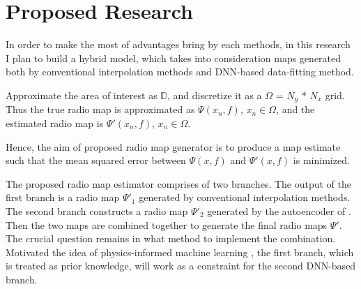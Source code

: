 \documentclass[conference]{IEEEtran}
\begin{document}
\section{Proposed Research}
In order to make the most of advantages bring by each methods, in this research I plan to build a hybrid model, which takes into consideration maps generated both by conventional interpolation methods and DNN-based data-fitting method.

Approximate the area of interest as $\mathbb{D}$, and discretize it as a $\Omega$ = $N_y$ * $N_x$ grid. Thus the true radio map is approximated as $\Psi(x_n, f)$, $x_n \in \Omega$, and the estimated radio map is $\Psi'(x_n, f)$, $x_n \in \Omega$.

Hence, the aim of proposed radio map generator is to produce a map estimate such that the mean squared error between  $\Psi(x, f)$ and $\Psi'(x, f)$ is minimized.

The proposed radio map estimator comprises of two branches. The output of the first branch is a radio map $\Psi'_1$ generated by conventional interpolation methods. The second branch constructs a radio map $\Psi'_2$ generated by the autoencoder of \cite{b9}. Then the two maps are combined together to generate the final radio maps $\Psi'$. The crucial question remains in what method to implement the combination. Motivated the idea of physics-informed machine learning \cite{b11}, the first branch, which is treated as prior knowledge, will work as a constraint for the second DNN-based branch.
\end{document}
